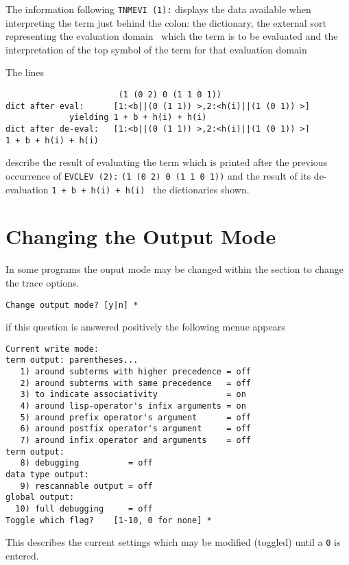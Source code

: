 The information following \texttt{TNMEVI (1):} displays the data
available when interpreting the term just behind the colon:
the dictionary, the external sort representing the evaluation domain
\wrt\ which the term is to be evaluated and the interpretation of the
top symbol of the term for that evaluation domain

The lines
\begin{verbatim}
                       (1 (0 2) 0 (1 1 0 1)) 
dict after eval:      [1:<b||(0 (1 1)) >,2:<h(i)||(1 (0 1)) >]
             yielding 1 + b + h(i) + h(i)
dict after de-eval:   [1:<b||(0 (1 1)) >,2:<h(i)||(1 (0 1)) >]
1 + b + h(i) + h(i)
\end{verbatim}
describe the  result of  evaluating the term which is printed after
the previous occurrence of \texttt{EVCLEV (2):}
\texttt{(1 (0 2) 0 (1 1 0 1))} and the result of its de-evaluation
\texttt{1 + b + h(i) + h(i)} \wrt\ the dictionaries shown.



\section{Changing the Output Mode}
\label{ap:output}

In some programs the ouput mode may be changed within the section to 
change the trace options.
\begin{verbatim}
Change output mode? [y|n] *
\end{verbatim}
if this question is answered positively the following menue appears
\begin{verbatim}
Current write mode:
term output: parentheses...
   1) around subterms with higher precedence = off
   2) around subterms with same precedence   = off
   3) to indicate associativity              = on
   4) around lisp-operator's infix arguments = on
   5) around prefix operator's argument      = off
   6) around postfix operator's argument     = off
   7) around infix operator and arguments    = off
term output:
   8) debugging          = off
data type output:
   9) rescannable output = off
global output:
  10) full debugging     = off
Toggle which flag?    [1-10, 0 for none] *
\end{verbatim}
This describes the current settings which may be modified  (toggled) until a 
\texttt{0} is entered.


